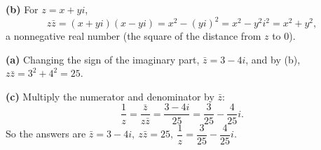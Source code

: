 \textbf{(b)} For $z=x+yi$,
\[
z\bar z=(x+yi)(x-yi)=x^2-(yi)^2=x^2-y^2i^2=x^2+y^2 ,
\]
a nonnegative real number (the square of the distance from $z$ to $0$).

\textbf{(a)} Changing the sign of the imaginary part, $\bar z=3-4i$, and by (b), $z\bar z=3^2+4^2=25$.

\textbf{(c)} Multiply the numerator and denominator by $\bar z$:
\[
\dfrac{1}{z}=\dfrac{\bar z}{z\bar z}=\dfrac{3-4i}{25}=\dfrac{3}{25}-\dfrac{4}{25}i .
\]
So the answers are $\boxed{\bar z=3-4i,\ z\bar z=25,\ \dfrac{1}{z}=\dfrac{3}{25}-\dfrac{4}{25}i}$.
